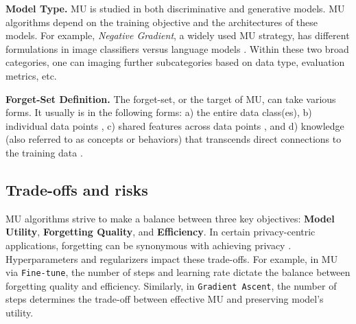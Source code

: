 \textbf{Model Type.} MU is studied in both discriminative and generative models. MU algorithms depend on the training objective and the architectures of these models. For example, \textit{Negative Gradient}, a widely used MU strategy, has different formulations in image classifiers \cite{golatkar2020eternal} versus language models \cite{yao2024muofllms}. Within these two broad categories, one can imaging further subcategories based on data type, evaluation metrics, etc. 

\textbf{Forget-Set Definition.} The forget-set, or the target of MU, can take various forms. It usually is in the following forms: a) the entire data class(es), b) individual data points \cite{kurmanji2023unboundedmachineunlearning}, c) shared features across data points \citep{warnecke2021muoflabelsfeatures}, and d) knowledge (also referred to as concepts or behaviors) that transcends direct connections to the training data \citep{gandikota2024unifiedconceptdelete}.


\subsection{Trade-offs and risks}
MU algorithms strive to make a balance between three key objectives: \textbf{Model Utility}, \textbf{Forgetting Quality}, and \textbf{Efficiency}. In certain privacy-centric applications, forgetting can be synonymous with achieving privacy \citep{liu2024breaking}. Hyperparameters and regularizers impact these trade-offs. For example, in MU via \texttt{Fine-tune}, the number of steps and learning rate dictate the balance between forgetting quality and efficiency. Similarly, in \texttt{Gradient Ascent}, the number of steps determines the trade-off between effective MU and preserving model's utility.


